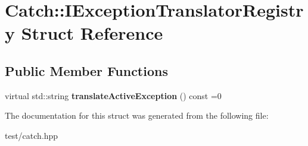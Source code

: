 \hypertarget{structCatch_1_1IExceptionTranslatorRegistry}{}\section{Catch\+:\+:I\+Exception\+Translator\+Registry Struct Reference}
\label{structCatch_1_1IExceptionTranslatorRegistry}
\subsection*{Public Member Functions}
\begin{DoxyCompactItemize}
\item 
virtual std\+::string {\bfseries translate\+Active\+Exception} () const =0\hypertarget{structCatch_1_1IExceptionTranslatorRegistry_af76ae8c331a17f2a94c9720bc0d686bb}{}\label{structCatch_1_1IExceptionTranslatorRegistry_af76ae8c331a17f2a94c9720bc0d686bb}

\end{DoxyCompactItemize}


The documentation for this struct was generated from the following file\+:\begin{DoxyCompactItemize}
\item 
test/catch.\+hpp\end{DoxyCompactItemize}
